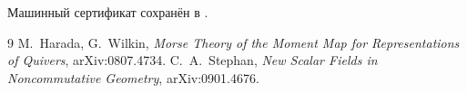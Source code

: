 Машинный сертификат сохранён в
.

\begin{thebibliography}{9}
M.~Harada, G.~Wilkin,
\emph{Morse Theory of the Moment Map for Representations of Quivers},
arXiv:0807.4734.
C.~A.~Stephan,
\emph{New Scalar Fields in Noncommutative Geometry},
arXiv:0901.4676.
\end{thebibliography}